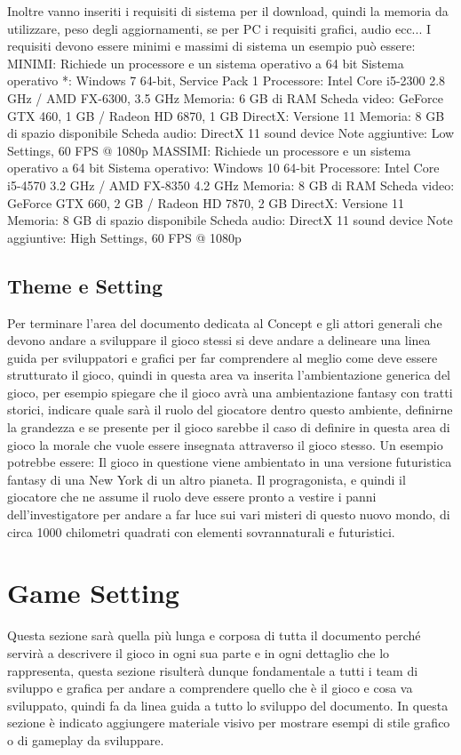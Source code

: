 \documentclass{report}
\begin{document}
\begin{itemize}
  Inoltre vanno inseriti i requisiti di sistema per il download, quindi la memoria da utilizzare, peso degli aggiornamenti, se per PC i requisiti grafici, audio ecc...
  I requisiti devono essere minimi e massimi di sistema un esempio può essere:
  MINIMI:
    Richiede un processore e un sistema operativo a 64 bit
    Sistema operativo *: Windows 7 64-bit, Service Pack 1
    Processore: Intel Core i5-2300 2.8 GHz / AMD FX-6300, 3.5 GHz
    Memoria: 6 GB di RAM
    Scheda video: GeForce GTX 460, 1 GB / Radeon HD 6870, 1 GB
    DirectX: Versione 11
    Memoria: 8 GB di spazio disponibile
    Scheda audio: DirectX 11 sound device
    Note aggiuntive: Low Settings, 60 FPS @ 1080p
  MASSIMI:
  Richiede un processore e un sistema operativo a 64 bit
    Sistema operativo: Windows 10 64-bit
    Processore: Intel Core i5-4570 3.2 GHz / AMD FX-8350 4.2 GHz
    Memoria: 8 GB di RAM
    Scheda video: GeForce GTX 660, 2 GB / Radeon HD 7870, 2 GB
    DirectX: Versione 11
    Memoria: 8 GB di spazio disponibile
    Scheda audio: DirectX 11 sound device
    Note aggiuntive: High Settings, 60 FPS @ 1080p
\end{itemize}

\subsection{Theme e Setting}
Per terminare l'area del documento dedicata al Concept e gli attori generali che devono andare a sviluppare il gioco stessi si deve andare a delineare una linea guida per sviluppatori e grafici per far comprendere al meglio come deve essere strutturato il gioco, quindi in questa area va inserita l'ambientazione generica del gioco, per esempio spiegare che il gioco avrà una ambientazione fantasy con tratti storici, indicare quale sarà il ruolo del giocatore dentro questo ambiente, definirne la grandezza e se presente per il gioco sarebbe il caso di definire in questa area di gioco la morale che vuole essere insegnata attraverso il gioco stesso.
Un esempio potrebbe essere: Il gioco in questione viene ambientato in una versione futuristica fantasy di una New York di un altro pianeta. Il progragonista, e quindi il giocatore che ne assume il ruolo deve essere pronto a vestire i panni dell'investigatore per andare a far luce sui vari misteri di questo nuovo mondo, di circa 1000 chilometri quadrati con elementi sovrannaturali e futuristici.

\newpage

\section{Game Setting}
Questa sezione sarà quella più lunga e corposa di tutta il documento perché servirà a descrivere il gioco in ogni sua parte e in ogni dettaglio che lo rappresenta, questa sezione risulterà dunque fondamentale a tutti i team di sviluppo e grafica per andare a comprendere quello che è il gioco e cosa va sviluppato, quindi fa da linea guida a tutto lo sviluppo del documento. In questa sezione è indicato aggiungere materiale visivo per mostrare esempi di stile grafico o di gameplay da sviluppare.
\end{document}
